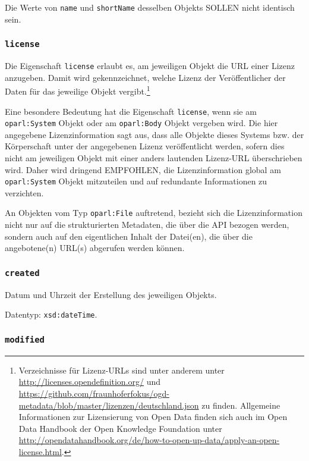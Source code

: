 \documentclass[,a4paper]{article}
\begin{document}
Die Werte von \texttt{name} und \texttt{shortName} desselben Objekts
SOLLEN nicht identisch sein.

\subsubsection{\texttt{license}}\label{license}

Die Eigenschaft \texttt{license} erlaubt es, am jeweiligen Objekt die
URL einer Lizenz anzugeben. Damit wird gekennzeichnet, welche Lizenz der
Veröffentlicher der Daten für das jeweilige Objekt vergibt.\footnote{Verzeichnisse
  für Lizenz-URLs sind unter anderem unter
  \url{http://licenses.opendefinition.org/} und
  \url{https://github.com/fraunhoferfokus/ogd-metadata/blob/master/lizenzen/deutschland.json}
  zu finden. Allgemeine Informationen zur Lizensierung von Open Data
  finden sich auch im Open Data Handbook der Open Knowledge Foundation
  unter
  \url{http://opendatahandbook.org/de/how-to-open-up-data/apply-an-open-license.html}.}

Eine besondere Bedeutung hat die Eigenschaft \texttt{license}, wenn sie
am \texttt{oparl:System} Objekt oder am \texttt{oparl:Body} Objekt
vergeben wird. Die hier angegebene Lizenzinformation sagt aus, dass alle
Objekte dieses Systems bzw. der Körperschaft unter der angegebenen
Lizenz veröffentlicht werden, sofern dies nicht am jeweiligen Objekt mit
einer anders lautenden Lizenz-URL überschrieben wird. Daher wird
dringend EMPFOHLEN, die Lizenzinformation global am
\texttt{oparl:System} Objekt mitzuteilen und auf redundante
Informationen zu verzichten.

An Objekten vom Typ \texttt{oparl:File} auftretend, bezieht sich die
Lizenzinformation nicht nur auf die strukturierten Metadaten, die über
die API bezogen werden, sondern auch auf den eigentlichen Inhalt der
Datei(en), die über die angebotene(n) URL(s) abgerufen werden können.

\subsubsection{\texttt{created}}\label{created}

Datum und Uhrzeit der Erstellung des jeweiligen Objekts.

Datentyp: \texttt{xsd:dateTime}.

\subsubsection{\texttt{modified}}\label{modified}
\end{document}

